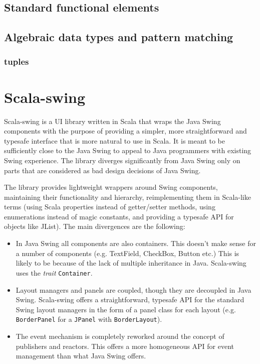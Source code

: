 \subsection{Standard functional elements}

\subsection{Algebraic data types and pattern matching}

\subsubsection{tuples}

\section{Scala-swing}

Scala-swing is a UI library written in Scala that wraps the Java Swing components with the purpose of providing a simpler, more straightforward and typesafe interface that is more natural to use in Scala. It is meant to be sufficiently close to the Java Swing to appeal to Java programmers with existing Swing experience.\cite{ScalaSwing} The library diverges significantly from Java Swing only on parts that are considered as bad design decisions of Java Swing.

The library provides lightweight wrappers around Swing components, maintaining their functionality and hierarchy, reimplementing them in Scala-like terms (using Scala properties instead of getter/setter methods, using enumerations instead of magic constants, and providing a typesafe API for objects like JList). The main divergences are the following:
\begin{itemize}
\item In Java Swing all components are also containers. This doesn't make sense for a number of components (e.g. TextField, CheckBox, Button etc.) This is likely to be because of the lack of multiple inheritance in Java. Scala-swing uses the \emph{trait} \texttt{Container}.

\item Layout managers and panels are coupled, though they are decoupled in Java Swing. Scala-swing offers a straightforward, typesafe API for the standard Swing layout managers in the form of a panel class for each layout (e.g. \texttt{BorderPanel} for a \texttt{JPanel} with \texttt{BorderLayout}).

\item The event mechanism is completely reworked around the concept of publishers and reactors. This offers a more homogeneous API for event management than what Java Swing offers.
\end{itemize}

